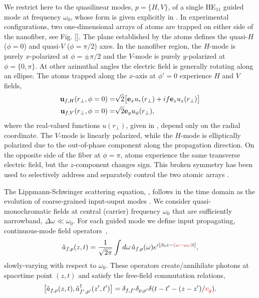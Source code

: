 \documentclass[preprint,aps,pra,onecolumn]{revtex4-1} %
\newcommand{\comment}[1]{{\color{Maroon} #1}}
\newcommand{\error}[1]{{\color{red} #1}}
\begin{document}
We restrict here to the quasilinear modes, $p =\{H,V\}$, of a single HE$_{11}$ guided mode at frequency $\omega_0$, whose form is given explicitly in .  In experimental configurations, two one-dimensional arrays of atoms are trapped on either side of the nanofiber, see Fig. \ref{}. The plane established by the atoms defines the quasi-$H$ ($\phi = 0$) and quasi-$V$ ($\phi = \pi/2$) axes. In the nanofiber region, the $H$-mode is purely $x$-polarized at $\phi = \pm \pi/2$ and the $V$-mode is purely $y$-polarized at $\phi = \{0,\pi\}$.  At other azimuthal angles the electric field is generally rotating along an ellipse.  The atoms trapped along the $x$-axis at $\phi'=0$ experience $H$ and $V$ fields,
	\begin{align}
		\mathbf{u}_{f,H}(r_\perp, \phi = 0) = & \sqrt{2} \big[ \mathbf{e}_x u_r(r_\perp)+  if \mathbf{e}_z  u_z(r_\perp) \big] \\
		\mathbf{u}_{f,V}(r_\perp, \phi = 0) = & \sqrt{2} \mathbf{e}_y u_\phi(r_\perp), 
	\end{align}
where the real-valued functions $u(r_\perp)$, given in , depend only on the radial coordinate.  The $V$-mode is linearly polarized, while the $H$-mode is elliptically polarized due to the out-of-phase component along the propagation direction.  On the opposite side of the fiber at $\phi = \pi$, atoms experience the same transverse electric field, but the $z$-component changes sign.  This broken symmetry has been used to selectively address and separately control the two atomic arrays \cite{mitsch_exploiting_2014, mitsch_quantum_2014, sayrin_storage_2015}.  

The Lippmann-Schwinger scattering equation, , follows in the time domain as the evolution of \error{coarse-grained} input-ouput modes \cite{gardiner_input_1985, fan_input-output_2010, le_kien_propagation_2014}.  We consider quasi-monochromatic fields at central (carrier) frequency $\omega_0$ that are sufficiently narrowband, $\Delta \omega \ll \omega_0$. For each guided mode we define input propagating, continuous-mode field operators~\cite{blow_continuum_1990, le_kien_correlations_2008},
	\begin{align}
		\hat{a}_{f,p}(z,t) =\frac{1}{\sqrt{2 \pi}}  \int d \omega \, \hat{a}_{f,p}(\omega) e^{i[ \beta_0 z- \comment{(\omega-\omega_0)} t ]}, 
	\end{align}
\comment{slowly-varying with respect to $\omega_0$}.  These operators create/annihilate photons at spacetime point $(z,t)$ and satisfy the free-field commutation relations,
	\begin{equation} \label{Eq::InputOutputCommutation}
		\big[\hat{a}_{f,p}(z,t),\hat{a}^\dag_{f',p'}(z',t')\big]=\delta_{f,f'}\delta_{p,p'}  \delta(t-t'-(z-z')/\error{v_g}).
	\end{equation}
	
\end{document}

